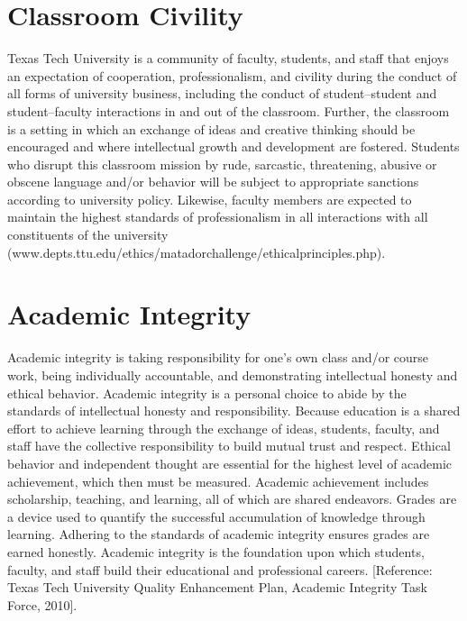 \documentclass[12pt, notitlepage]{article}   	%
\begin{document}
{\section{Classroom Civility}
Texas Tech University is a community of faculty, students, and staff that enjoys 
an expectation of cooperation, professionalism, and civility during the conduct of all 
forms of university business, including the conduct of student–student and student–faculty 
interactions in and out of the classroom. 
Further, the classroom is a setting in which an exchange of ideas and creative thinking 
should be encouraged and where intellectual growth and development are fostered. 
Students who disrupt this classroom mission by rude, sarcastic, threatening, abusive or 
obscene language and/or behavior will be subject to appropriate sanctions according to 
university policy.  Likewise, faculty members are expected to maintain the highest standards of professionalism in all interactions with all constituents of the university (www.depts.ttu.edu/ethics/matadorchallenge/ethicalprinciples.php).

\section{Academic Integrity}
Academic integrity is taking responsibility for one’s own class and/or course work, 
being individually accountable, and demonstrating intellectual honesty and ethical behavior. 
Academic integrity is a personal choice to abide by the standards of intellectual honesty 
and responsibility. 
Because education is a shared effort to achieve learning through the exchange of ideas, 
students, faculty, and staff have the collective responsibility to build mutual trust and respect. 
Ethical behavior and independent thought are essential for the highest level of academic 
achievement, which then must be measured. 
Academic achievement includes scholarship, teaching, and learning, all of which are shared endeavors. 
Grades are a device used to quantify the successful accumulation of knowledge through learning. 
Adhering to the standards of academic integrity ensures grades are earned honestly. 
Academic integrity is the foundation upon which students, faculty, and staff build their 
educational and professional careers. [Reference: Texas Tech University Quality 
Enhancement Plan, Academic Integrity Task Force, 2010].

}
\end{document}
